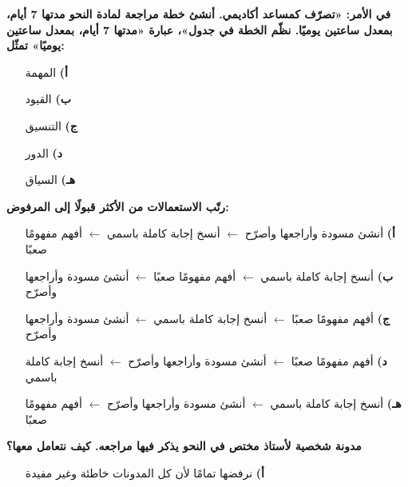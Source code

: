 \documentclass[11pt,a4paper]{article}
\begin{document}
\begin{multicols}{2}
\begin{minipage}{\linewidth}
\hangindent=0.7cm\textbf{في الأمر: «تصرّف كمساعد أكاديمي. أنشئ خطة مراجعة لمادة النحو مدتها 7 أيام، بمعدل ساعتين يوميًا. نظّم الخطة في جدول»، عبارة «مدتها 7 أيام، بمعدل ساعتين يوميًا» تمثّل:}
\begin{itemize}[leftmargin=0.95cm, labelsep=4pt, itemsep=0pt, topsep=2pt, parsep=0pt]
  \item[\textbf{أ)}] المهمة
  \item[\textbf{ب)}] القيود
  \item[\textbf{ج)}] التنسيق
  \item[\textbf{د)}] الدور
  \item[\textbf{هـ)}] السياق
\end{itemize}
\end{minipage}\par\vspace{7pt plus 4pt}
\noindent\begin{minipage}{\linewidth}
\hangindent=0.7cm\textbf{رتّب الاستعمالات من الأكثر قبولًا إلى المرفوض:}
\begin{itemize}[leftmargin=0.95cm, labelsep=4pt, itemsep=0pt, topsep=2pt, parsep=0pt]
  \item[\textbf{أ)}] أنشئ مسودة وأراجعها وأصرّح $\leftarrow$ أنسخ إجابة كاملة باسمي $\leftarrow$ أفهم مفهومًا صعبًا
  \item[\textbf{ب)}] أنسخ إجابة كاملة باسمي $\leftarrow$ أفهم مفهومًا صعبًا $\leftarrow$ أنشئ مسودة وأراجعها وأصرّح
  \item[\textbf{ج)}] أفهم مفهومًا صعبًا $\leftarrow$ أنسخ إجابة كاملة باسمي $\leftarrow$ أنشئ مسودة وأراجعها وأصرّح
  \item[\textbf{د)}] أفهم مفهومًا صعبًا $\leftarrow$ أنشئ مسودة وأراجعها وأصرّح $\leftarrow$ أنسخ إجابة كاملة باسمي
  \item[\textbf{هـ)}] أنسخ إجابة كاملة باسمي $\leftarrow$ أنشئ مسودة وأراجعها وأصرّح $\leftarrow$ أفهم مفهومًا صعبًا
\end{itemize}
\end{minipage}\par\vspace{7pt plus 4pt}
\noindent\begin{minipage}{\linewidth}
\hangindent=0.7cm\textbf{مدونة شخصية لأستاذ مختص في النحو يذكر فيها مراجعه. كيف نتعامل معها؟}
\begin{itemize}[leftmargin=0.95cm, labelsep=4pt, itemsep=0pt, topsep=2pt, parsep=0pt]
  \item[\textbf{أ)}] نرفضها تمامًا لأن كل المدونات خاطئة وغير مفيدة

\end{itemize}
\end{minipage}
\end{multicols}
\end{document}
